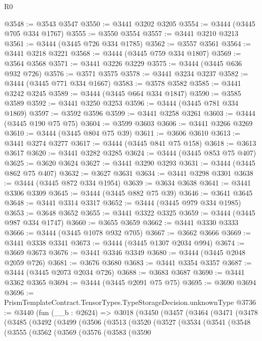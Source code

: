 \begin{lexlean}{R0}
\begin{coremodule}
@3548 := @3543 @3547
@3550 := @3441 @3202 @3205
@3554 := @3444 (@3445 @705 @334 @1767)
@3555 := @3550 @3554
@3557 := @3441 @3210 @3213
@3561 := @3444 (@3445 @726 @334 @1785)
@3562 := @3557 @3561
@3564 := @3441 @3218 @3221
@3568 := @3444 (@3445 @759 @334 @1807)
@3569 := @3564 @3568
@3571 := @3441 @3226 @3229
@3575 := @3444 (@3445 @636 @932 @726)
@3576 := @3571 @3575
@3578 := @3441 @3234 @3237
@3582 := @3444 (@3445 @771 @334 @1667)
@3583 := @3578 @3582
@3585 := @3441 @3242 @3245
@3589 := @3444 (@3445 @664 @334 @1847)
@3590 := @3585 @3589
@3592 := @3441 @3250 @3253
@3596 := @3444 (@3445 @781 @334 @1869)
@3597 := @3592 @3596
@3599 := @3441 @3258 @3261
@3603 := @3444 (@3445 @190 @75 @75)
@3604 := @3599 @3603
@3606 := @3441 @3266 @3269
@3610 := @3444 (@3445 @804 @75 @39)
@3611 := @3606 @3610
@3613 := @3441 @3274 @3277
@3617 := @3444 (@3445 @841 @75 @158)
@3618 := @3613 @3617
@3620 := @3441 @3282 @3285
@3624 := @3444 (@3445 @853 @75 @407)
@3625 := @3620 @3624
@3627 := @3441 @3290 @3293
@3631 := @3444 (@3445 @862 @75 @407)
@3632 := @3627 @3631
@3634 := @3441 @3298 @3301
@3638 := @3444 (@3445 @872 @334 @1954)
@3639 := @3634 @3638
@3641 := @3441 @3306 @3309
@3645 := @3444 (@3445 @882 @75 @39)
@3646 := @3641 @3645
@3648 := @3441 @3314 @3317
@3652 := @3444 (@3445 @979 @334 @1985)
@3653 := @3648 @3652
@3655 := @3441 @3322 @3325
@3659 := @3444 (@3445 @987 @334 @1747)
@3660 := @3655 @3659
@3662 := @3441 @3330 @3333
@3666 := @3444 (@3445 @1078 @932 @705)
@3667 := @3662 @3666
@3669 := @3441 @3338 @3341
@3673 := @3444 (@3445 @1307 @2034 @994)
@3674 := @3669 @3673
@3676 := @3441 @3346 @3349
@3680 := @3444 (@3445 @2048 @2059 @726)
@3681 := @3676 @3680
@3683 := @3441 @3354 @3357
@3687 := @3444 (@3445 @2073 @2034 @726)
@3688 := @3683 @3687
@3690 := @3441 @3362 @3365
@3694 := @3444 (@3445 @2091 @75 @75)
@3695 := @3690 @3694
@3696 := PrismTemplateContract.TensorTypes.TypeStorageDecision.unknownType
@3736 := @3440
    (fun (__b : @2624) =>
    @3018
      (@3450
        (@3457
          (@3464
            (@3471
              (@3478
                (@3485
                  (@3492
                    (@3499
                      (@3506
                        (@3513
                          (@3520
                            (@3527
                              (@3534
                                (@3541
                                  (@3548
                                    (@3555
                                      (@3562
                                        (@3569
                                          (@3576
                                            (@3583
                                              (@3590

\end{coremodule}
\end{lexlean}
